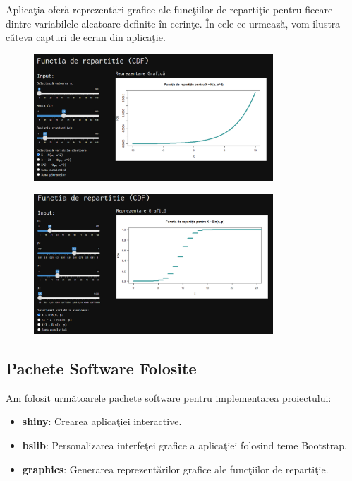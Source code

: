 \documentclass[a4paper,11pt]{article}
\begin{document}
Aplica\c{t}ia ofer\u{a} reprezent\u{a}ri grafice ale func\c{t}iilor de reparti\c{t}ie pentru fiecare dintre variabilele aleatoare definite în cerin\c{t}e. În cele ce urmeaz\u{a}, vom ilustra c\u{a}teva capturi de ecran din aplica\c{t}ie.

\begin{figure}[h!]
  \centering
  \includegraphics[width=0.8\textwidth]{./img/4.png}
  \label{fig:imaginea_ta_3}
\end{figure}

\begin{figure}[h!]
  \centering
  \includegraphics[width=0.8\textwidth]{./img/5.png}
  \label{fig:imaginea_ta_3}
\end{figure}

\subsection*{Pachete Software Folosite}

Am folosit urm\u{a}toarele pachete software pentru implementarea proiectului:

\begin{itemize}
    \item \textbf{shiny}: Crearea aplica\c{t}iei interactive.
    \item \textbf{bslib}: Personalizarea interfe\c{t}ei grafice a aplica\c{t}iei folosind teme Bootstrap.
    \item \textbf{graphics}: Generarea reprezent\u{a}rilor grafice ale func\c{t}iilor de reparti\c{t}ie.
\end{itemize}
\end{document}
